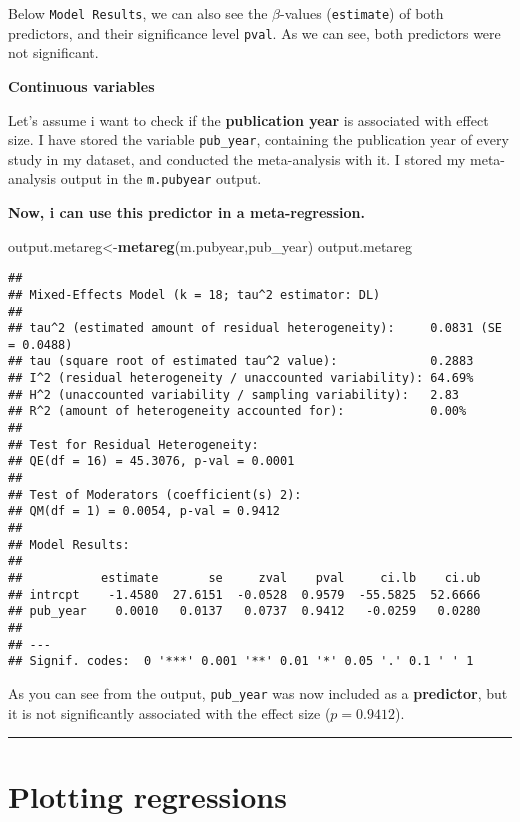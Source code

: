 \documentclass[]{book}
\newenvironment{Shaded}{\begin{snugshade}}{\end{snugshade}}
\newcommand{\KeywordTok}[1]{\textcolor[rgb]{0.13,0.29,0.53}{\textbf{#1}}}
\newcommand{\NormalTok}[1]{#1}
\theoremstyle{definition}
\theoremstyle{definition}
\theoremstyle{definition}
\theoremstyle{remark}
\begin{document}
Below \texttt{Model\ Results}, we can also see the \(\beta\)-values
(\texttt{estimate}) of both predictors, and their significance level
\texttt{pval}. As we can see, both predictors were not significant.

\textbf{Continuous variables}

Let's assume i want to check if the \textbf{publication year} is
associated with effect size. I have stored the variable
\texttt{pub\_year}, containing the publication year of every study in my
dataset, and conducted the meta-analysis with it. I stored my
meta-analysis output in the \texttt{m.pubyear} output.

\textbf{Now, i can use this predictor in a meta-regression.}

\begin{Shaded}
\begin{Highlighting}[]
\NormalTok{output.metareg<-}\KeywordTok{metareg}\NormalTok{(m.pubyear,pub_year)}
\NormalTok{output.metareg}
\end{Highlighting}
\end{Shaded}

\begin{verbatim}
## 
## Mixed-Effects Model (k = 18; tau^2 estimator: DL)
## 
## tau^2 (estimated amount of residual heterogeneity):     0.0831 (SE = 0.0488)
## tau (square root of estimated tau^2 value):             0.2883
## I^2 (residual heterogeneity / unaccounted variability): 64.69%
## H^2 (unaccounted variability / sampling variability):   2.83
## R^2 (amount of heterogeneity accounted for):            0.00%
## 
## Test for Residual Heterogeneity: 
## QE(df = 16) = 45.3076, p-val = 0.0001
## 
## Test of Moderators (coefficient(s) 2): 
## QM(df = 1) = 0.0054, p-val = 0.9412
## 
## Model Results:
## 
##           estimate       se     zval    pval     ci.lb    ci.ub   
## intrcpt    -1.4580  27.6151  -0.0528  0.9579  -55.5825  52.6666   
## pub_year    0.0010   0.0137   0.0737  0.9412   -0.0259   0.0280   
## 
## ---
## Signif. codes:  0 '***' 0.001 '**' 0.01 '*' 0.05 '.' 0.1 ' ' 1
\end{verbatim}

As you can see from the output, \texttt{pub\_year} was now included as a
\textbf{predictor}, but it is not significantly associated with the
effect size (\(p=0.9412\)).

\begin{center}\rule{0.5\linewidth}{\linethickness}\end{center}

\section{Plotting regressions}\label{plotting-regressions}
\end{document}
